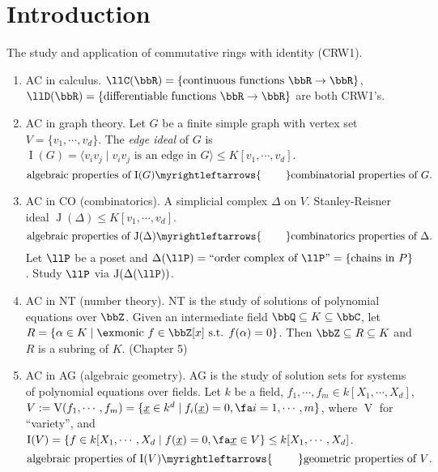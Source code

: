 \chapter*{Introduction}


The study and application of commutative rings with identity (CRW1).
    \begin{enumerate}
        \item AC in calculus. $\llC(\bbR) = \{\text{continuous functions }\bbR \to \bbR\}$, $\llD(\bbR) = \{\text{differentiable functions }\bbR \to \bbR\}$ are both CRW1's.
        \item AC in graph theory. Let $G$ be a finite simple graph with vertex set $V = \{v_1,\cdots,v_d\}$. The \emph{edge ideal} of $G$ is $\operatorname{I}(G) = \langle v_iv_j \mid v_iv_j \text{ is an edge in }G \rangle \leq K[v_1,\cdots,v_d]$. 
            \[\text{algebraic properties of $\operatorname{I}(G)$} \myrightleftarrows{\rule{0.8cm}{0cm}} \text{combinatorial properties of $G$}.\]
        \item AC in CO (combinatorics).  A simplicial complex $\Delta$ on $V$. Stanley-Reisner ideal $\operatorname{J}(\Delta) \leq K[v_1,\cdots,v_d]$. 
            \[\text{algebraic properties of $\operatorname{J}(\Delta)$} \myrightleftarrows{\rule{0.8cm}{0cm}} \text{combinatorics properties of $\Delta$}.\]
            Let $\llP$ be a poset and $\Delta(\llP) = ``\text{order complex of $\llP$''} = \{\text{chains in $P$}\}$. Study $\llP$ via $\operatorname{J}(\Delta(\llP))$. 
        \item AC in NT (number theory). NT is the study of solutions of polynomial equations over $\bbZ$. Given an intermediate field $\bbQ \subseteq K \subseteq \bbC$, let $R = \{\alpha \in K \mid \ex \text{monic }f \in \bbZ[x] \text{ s.t. } f(\alpha) = 0\}$. Then $\bbZ \subseteq R \subseteq K$ and $R$ is a subring of $K$. (Chapter 5)
        \item AC in AG (algebraic geometry). AG is the study of solution sets for systems of polynomial equations over fields. Let $k$ be a field, $f_1,\cdots,f_m \in k[X_1,\cdots,X_d]$, $V := \operatorname{V}(f_1,\cdots,f_m) = \{\underline x \in k^d \mid f_i(\underline x) = 0,\fa i = 1,\cdots,m\}$, where $\operatorname{V}$ for ``variety'', and $\operatorname{I}(V) = \{f \in k[X_1,\cdots,X_d \mid f(\underline x) = 0,\fa \underline x \in V\} \leq k[X_1,\cdots,X_d]$. 
            \[\text{algebraic properties of $\operatorname{I}(V)$} \myrightleftarrows{\rule{0.8cm}{0cm}} \text{geometric properties of $V$}.\]
    \end{enumerate}

